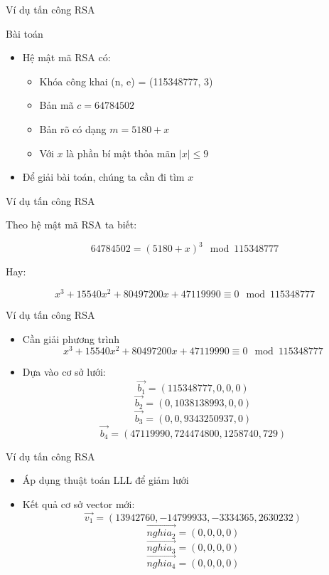 \begin{frame}{Ví dụ tấn công RSA}

\begin{block}{Bài toán}
\begin{itemize}
\item Hệ mật mã RSA có:

\begin{itemize}
\item Khóa công khai (n, e) = (115348777, 3)
\item Bản mã $c = 64784502$
\item Bản rõ có dạng $m = 5180 + x$
\item Với $x$ là phần bí mật thỏa mãn $|x| \leq 9$
\end{itemize}
\item Để giải bài toán, chúng ta cần đi tìm $x$
\end{itemize}

\end{block}
\end{frame}
\begin{frame}{Ví dụ tấn công RSA}

Theo hệ mật mã RSA ta biết:

\[
64784502 = (5180 + x)^3 \mod 115348777
\]

Hay:

\[
x^3 + 15540x^2 + 80497200x + 47119990 \equiv 0 \mod 115348777
\]

\end{frame}
\begin{frame}{Ví dụ tấn công RSA}

\begin{itemize}
\item Cần giải phương trình
\[
x^3 + 15540x^2 + 80497200x + 47119990 \equiv 0 \mod 115348777
\]
\item Dựa vào cơ sở lưới:
\[
\vec{b_1} = (115348777, 0, 0, 0)
\]
\[
\vec{b_2} = (0, 1038138993, 0, 0)
\]
\[
\vec{b_3} = (0, 0, 9343250937, 0)
\]
\[
\vec{b_4} = (47119990, 724474800, 1258740, 729)
\]
\end{itemize}

\end{frame}
\begin{frame}{Ví dụ tấn công RSA}

\begin{itemize}
\item Áp dụng thuật toán LLL để giảm lưới
\item Kết quả cơ sở vector mới:
\[
\vec{v_1} = (13942760, -14799933, -3334365, 2630232)
\]
\[
\vec{nghia_2} = (0, 0, 0, 0)
\]
\[
\vec{nghia_3} = (0, 0, 0, 0)
\]
\[
\vec{nghia_4} = (0, 0, 0, 0)
\]

\end{itemize}

\end{frame}
